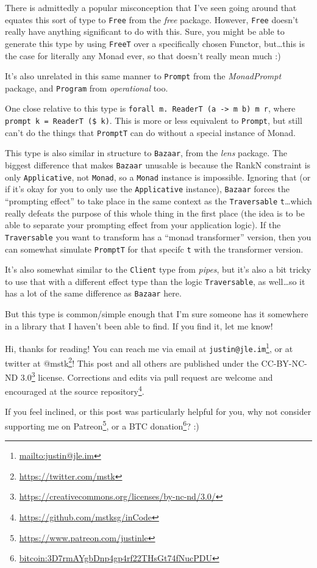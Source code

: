 \documentclass[]{article}
\renewcommand{\href}[2]{#2\footnote{\url{#1}}}
\begin{document}
There is admittedly a popular misconception that I've seen going around that
equates this sort of type to \texttt{Free} from the \emph{free} package.
However, \texttt{Free} doesn't really have anything significant to do with this.
Sure, you might be able to generate this type by using \texttt{FreeT} over a
specifically chosen Functor, but\ldots{}this is the case for literally any Monad
ever, so that doesn't really mean much :)

It's also unrelated in this same manner to \texttt{Prompt} from the
\emph{MonadPrompt} package, and \texttt{Program} from \emph{operational} too.

One close relative to this type is
\texttt{forall\ m.\ ReaderT\ (a\ -\textgreater{}\ m\ b)\ m\ r}, where
\texttt{prompt\ k\ =\ ReaderT\ (\$\ k)}. This is more or less equivalent to
\texttt{Prompt}, but still can't do the things that \texttt{PromptT} can do
without a special instance of Monad.

This type is also similar in structure to \texttt{Bazaar}, from the \emph{lens}
package. The biggest difference that makes \texttt{Bazaar} unusable is because
the RankN constraint is only \texttt{Applicative}, not \texttt{Monad}, so a
\texttt{Monad} instance is impossible. Ignoring that (or if it's okay for you to
only use the \texttt{Applicative} instance), \texttt{Bazaar} forces the
``prompting effect'' to take place in the same context as the
\texttt{Traversable} \texttt{t}\ldots{}which really defeats the purpose of this
whole thing in the first place (the idea is to be able to separate your
prompting effect from your application logic). If the \texttt{Traversable} you
want to transform has a ``monad transformer'' version, then you can somewhat
simulate \texttt{PromptT} for that specifc \texttt{t} with the transformer
version.

It's also somewhat similar to the \texttt{Client} type from \emph{pipes}, but
it's also a bit tricky to use that with a different effect type than the logic
\texttt{Traversable}, as well\ldots{}so it has a lot of the same difference as
\texttt{Bazaar} here.

But this type is common/simple enough that I'm sure someone has it somewhere in
a library that I haven't been able to find. If you find it, let me know!

Hi, thanks for reading! You can reach me via email at
\href{mailto:justin@jle.im}{\nolinkurl{justin@jle.im}}, or at twitter at
\href{https://twitter.com/mstk}{@mstk}! This post and all others are published
under the \href{https://creativecommons.org/licenses/by-nc-nd/3.0/}{CC-BY-NC-ND
3.0} license. Corrections and edits via pull request are welcome and encouraged
at \href{https://github.com/mstksg/inCode}{the source repository}.

If you feel inclined, or this post was particularly helpful for you, why not
consider \href{https://www.patreon.com/justinle}{supporting me on Patreon}, or a
\href{bitcoin:3D7rmAYgbDnp4gp4rf22THsGt74fNucPDU}{BTC donation}? :)
\end{document}
